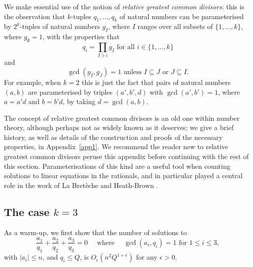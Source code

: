 \documentclass[11pt,letterpaper]{amsart}
\newcommand{\abs}[1]{\left\lvert #1\right\rvert}
\newcommand{\ogcd}[2]{\gcd(#1,#2)}
\theoremstyle{definition}
\begin{document}
We make essential use of the notion of \emph{relative greatest common divisors}: this is the observation that $k$-tuples $q_1,\ldots,q_k$ of natural numbers can be parameterised by $2^k$-tuples of natural numbers $g_I$, where $I$ ranges over all subsets of $\{1,\ldots,k\}$, where $g_\emptyset = 1$, with the properties that 
\[q_i=\prod_{I \ni i}g_I\textrm{ for all }i\in \{1, \ldots, k\}\]
and
\[\ogcd{g_I}{g_J}=1\textrm{ unless }I\subseteq J \textrm{ or }J\subseteq I.\]
For example, when $k=2$ this is just the fact that pairs of natural numbers $(a,b)$ are parameterised by triples $(a',b',d)$ with $\ogcd{a'}{b'}=1$, where $a=a'd$ and $b=b'd$, by taking $d=\ogcd{a}{b}$. 

The concept of relative greatest common divisors is an old one within number theory, although perhaps not as widely known as it deserves; we give a brief history, as well as details of the construction and proofs of the necessary properties, in Appendix~\ref{app1}. We recommend the reader new to relative greatest common divisors peruse this appendix before continuing with the rest of this section. Parameterisations of this kind are a useful tool when counting solutions to linear equations in the rationals, and in particular played a central role in the work of La Bret\`{e}che \cite{dlB} and Heath-Brown \cite{H-B}.

\subsection{The case $k=3$}\label{subsec:k-3-first-case}
As a warm-up, we first show that the number of solutions to 
\begin{equation}\label{eq-k3}
\frac{a_1}{q_1}+\frac{a_2}{q_2}+\frac{a_3}{q_3}=0\quad\textrm{ where }\quad\ogcd{a_i}{q_i}=1\textrm{ for }1\leq i\leq 3, 
\end{equation}
with $\abs{a_i}\leq n$, and $q_i\leq Q$, is $O_\epsilon(n^2Q^{1+\epsilon})$ for any $\epsilon>0$. 
\end{document}
